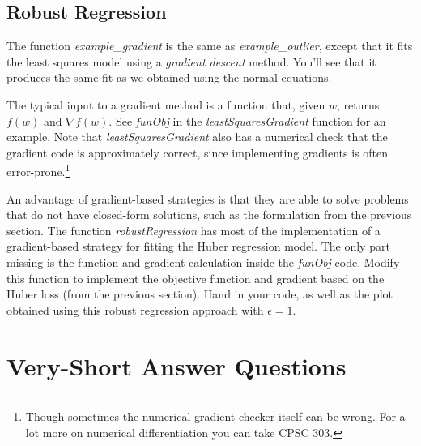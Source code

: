 \documentclass{article}
\def\blu#1{{\color{blu}#1}}
\begin{document}
\subsection{Robust Regression}

The function \emph{example\_gradient} is the same as \emph{example\_outlier}, except that it fits the least squares model using a \emph{gradient descent} method. You'll see that it produces the same fit as we obtained using the normal equations.

The typical input to a gradient method is a function that, given $w$, returns $f(w)$ and $\nabla f(w)$. See \emph{funObj} in the \emph{leastSquaresGradient} function for an example. Note that \emph{leastSquaresGradient} also has a numerical check that the gradient code is approximately correct, since implementing gradients is often error-prone.\footnote{Though sometimes the numerical gradient checker itself can be wrong. For a lot more on numerical differentiation you can take CPSC 303.}

An advantage of gradient-based strategies is that they are able to solve problems that do not have closed-form solutions, such as the formulation from the previous section. The function \emph{robustRegression} has most of the implementation of a gradient-based strategy for fitting the Huber regression model. The only part missing is the function and gradient calculation inside the \emph{funObj} code. \blu{Modify this function to implement the objective function and gradient based on the Huber loss (from the previous section). Hand in your code, as well as the plot obtained using this robust regression approach with $\epsilon = 1$.}

\pagebreak

\section{Very-Short Answer Questions}
\end{document}

